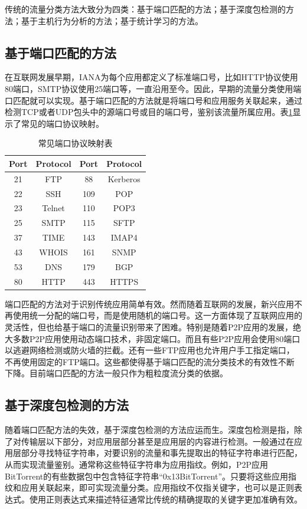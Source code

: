 传统的流量分类方法大致分为四类：基于端口匹配的方法；基于深度包检测的方法；基于主机行为分析的方法；基于统计学习的方法。
\subsection{基于端口匹配的方法}
在互联网发展早期，IANA为每个应用都定义了标准端口号，比如HTTP协议使用80端口，SMTP协议使用25端口等，一直沿用至今。因此，早期的流量分类使用端口匹配就可以实现。基于端口匹配的方法就是将端口号和应用服务关联起来，通过检测TCP或者UDP包头中的源端口号或目的端口号，鉴别该流量所属应用。表\ref{tab:21}显示了常见的端口协议映射。
\begin{table} [thb]
\caption{常见端口协议映射表}\label{tab:21}
\small
\centering
{
\begin{tabular}{cccc}
  \toprule
        Port & Protocol & Port & Protocol\\
  \midrule
        21 & FTP & 88 & Kerberos\\
        22 & SSH & 109 & POP\\
        23 & Telnet & 110 & POP3\\
        25 & SMTP & 115 & SFTP\\
        37 & TIME & 143 & IMAP4\\
        43 & WHOIS & 161 & SNMP\\
        53 & DNS & 179 & BGP\\
        80 & HTTP & 443 & HTTPS\\

 \bottomrule
\end{tabular}
}
\end{table}

端口匹配的方法对于识别传统应用简单有效。然而随着互联网的发展，新兴应用不再使用统一分配的端口号，而是使用随机的端口号。这一方面体现了互联网应用的灵活性，但也给基于端口的流量识别带来了困难。特别是随着P2P应用的发展，绝大多数P2P应用使用动态端口技术，非固定端口。而且有些P2P应用会使用80端口以逃避网络检测或防火墙的拦截。还有一些FTP应用也允许用户手工指定端口，不再使用固定的FTP端口。这些都使得基于端口匹配的流分类技术的有效性不断下降。目前端口匹配的方法一般只作为粗粒度流分类的依据。
\subsection{基于深度包检测的方法}

随着端口匹配方法的失效，基于深度包检测的方法应运而生。深度包检测是指，除了对传输层以下部分，对应用层部分甚至是应用层的内容进行检测。一般通过在应用层部分寻找特征字符串，对要识别的流量和事先提取出的特征字符串进行匹配，从而实现流量鉴别。通常称这些特征字符串为应用指纹。例如，P2P应用BitTorrent的有些数据包中包含特征字符串“0x13BitTorrent”。只要将这些应用指纹和应用关联起来，即可实现流量分类。应用指纹不仅指关键字，也可以是正则表达式。使用正则表达式来描述特征通常比传统的精确提取的关键字更加准确有效。

